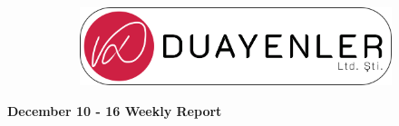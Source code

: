 \documentclass[a4paper,12pt]{article}
\begin{document}
	
\begin{figure}
	\vspace*{-.7cm}
	\centering
	\begin{figure}[H]
		\centering
		\setlength{\unitlength}{\textwidth} 
		\includegraphics[width=0.9\unitlength]{../../../documents/logos/logo3-with-stroke}
	\end{figure}
\end{figure}
\vspace*{-1.7cm}
\begin{center}
	\Large\textbf{December 10 - 16 Weekly Report}
	\end{center}
\end{document}
